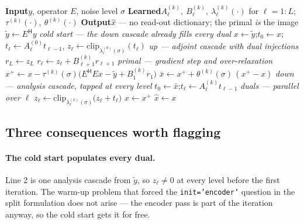 \documentclass[11pt]{article}
\newcommand{\clip}{\mathrm{clip}}
\newcommand{\adj}{{\mathsf H}}
\begin{document}
\begin{algorithm}[H]
\caption{ML-LPDS, unrolled --- $K$ layers over $L$ levels}
\begin{algorithmic}[1]
\Statex \textbf{Input}\quad $y$, operator $E$, noise level $\sigma$
\Statex \textbf{Learned}\quad $A_\ell^{(k)},\ B_\ell^{(k)},\ \lambda_\ell^{(k)}(\cdot)$ for $\ell=1{:}L$;\;
        $\tau^{(k)}(\cdot),\ \theta^{(k)}(\cdot)$
\Statex \textbf{Output}\quad $\hat x$ --- no read-out dictionary; the primal \emph{is} the image
\Statex\hrulefill
\State $\tilde y \gets E^\adj y$
\Statex \textit{cold start --- the down cascade already fills every dual}
\State $x \gets \tilde y$;\quad $t_0 \gets x$;\quad $t_\ell \gets A_\ell^{(0)} t_{\ell-1}$,\quad
       $z_\ell \gets \clip_{\lambda_\ell^{(0)}(\sigma)}(t_\ell)$ 
  \Statex \hspace{\algorithmicindent}\textit{up --- adjoint cascade with dual injections}
  \State $r_L \gets z_L$
  \State $r_\ell \gets z_\ell + B_{\ell+1}^{(k)} r_{\ell+1}$ 
  \Statex \hspace{\algorithmicindent}\textit{primal --- gradient step and over-relaxation}
  \State $x^{+} \gets x - \tau^{(k)}(\sigma)\big(E^\adj E x - \tilde y + B_1^{(k)} r_1\big)$
  \State $\bar x \gets x^{+} + \theta^{(k)}(\sigma)\,(x^{+} - x)$
  \Statex \hspace{\algorithmicindent}\textit{down --- analysis cascade, tapped at every level}
  \State $t_0 \gets \bar x$;\quad $t_\ell \gets A_\ell^{(k)} t_{\ell-1}$ 
  \Statex \hspace{\algorithmicindent}\textit{duals --- parallel over $\ell$}
  \State $z_\ell \gets \clip_{\lambda_\ell^{(k)}(\sigma)}\!\big(z_\ell + t_\ell\big)$ 
  \State $x \gets x^{+}$
\EndFor
\State $\hat x \gets x$
\end{algorithmic}
\end{algorithm}

\subsection*{Three consequences worth flagging}

\paragraph{The cold start populates every dual.}
Line 2 is one analysis cascade from $\tilde y$, so $z_\ell \ne 0$ at every level before the first iteration.
The warm-up problem that forced the \texttt{init='encoder'} question in the split formulation does not arise
--- the encoder pass is part of the iteration anyway, so the cold start gets it for free.
\end{document}
